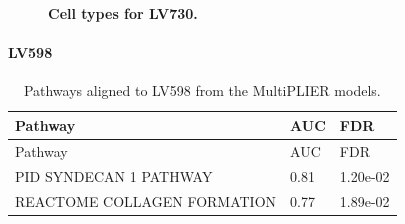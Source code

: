 \documentclass[
  a4paper,
]{article}
\newenvironment{fignos:tagged-figure}[1][]{
  \let\oldfigurename\figurename
  \renewcommand{\figurename}{Supplementary Figure}
}{
  \let\figurename\oldfigurename
}
\newenvironment{tablenos:tagged-table}[1][]{
  \let\oldtablename\tablename
  \renewcommand{\tablename}{Supplementary Table}
}{
  \let\tablename\oldtablename
}
\begin{document}
\begin{fignos:tagged-figure}[S19]

\begin{figure}
\hypertarget{fig:sup:lv730}{%
\centering

\caption{\textbf{Cell types for LV730.}
}\label{fig:sup:lv730}
}
\end{figure}

\end{fignos:tagged-figure}

\clearpage

\hypertarget{lv598}{%
\paragraph{LV598}\label{lv598}}

\begin{tablenos:tagged-table}[S21]

\begin{longtable}[]{@{}lll@{}}
\caption{Pathways aligned to LV598 from the MultiPLIER models.
\label{tbl:sup:multiplier_pathways:lv598}}\label{tbl:sup:multiplier_pathways:lv598}\tabularnewline
\toprule()
Pathway & AUC & FDR \\
\midrule()
\endfirsthead
\toprule()
Pathway & AUC & FDR \\
\midrule()
\endhead
PID SYNDECAN 1 PATHWAY & 0.81 & 1.20e-02 \\
REACTOME COLLAGEN FORMATION & 0.77 & 1.89e-02 \\
\bottomrule()
\end{longtable}

\end{tablenos:tagged-table}
\end{document}
